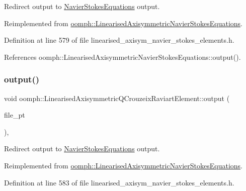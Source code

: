 Redirect output to \hyperlink{classoomph_1_1NavierStokesEquations}{Navier\+Stokes\+Equations} output. 



Reimplemented from \hyperlink{classoomph_1_1LinearisedAxisymmetricNavierStokesEquations_af91220377d90bc7506327e4f1de9e42a}{oomph\+::\+Linearised\+Axisymmetric\+Navier\+Stokes\+Equations}.



Definition at line 579 of file linearised\+\_\+axisym\+\_\+navier\+\_\+stokes\+\_\+elements.\+h.



References oomph\+::\+Linearised\+Axisymmetric\+Navier\+Stokes\+Equations\+::output().

\mbox{\label{classoomph_1_1LinearisedAxisymmetricQCrouzeixRaviartElement_a36138cdd6b03f179d648edeb0b0b31e1}} 
\subsubsection{\texorpdfstring{output()}{output()}\hspace{0.1cm}{\footnotesize\ttfamily [3/4]}}
{\footnotesize\ttfamily void oomph\+::\+Linearised\+Axisymmetric\+Q\+Crouzeix\+Raviart\+Element\+::output (\begin{DoxyParamCaption}\item[{F\+I\+LE $\ast$}]{file\+\_\+pt }\end{DoxyParamCaption})\hspace{0.3cm}{\ttfamily [inline]}, {\ttfamily [virtual]}}



Redirect output to \hyperlink{classoomph_1_1NavierStokesEquations}{Navier\+Stokes\+Equations} output. 



Reimplemented from \hyperlink{classoomph_1_1LinearisedAxisymmetricNavierStokesEquations_a11528829faa67968adcb46ad7cfa1fb2}{oomph\+::\+Linearised\+Axisymmetric\+Navier\+Stokes\+Equations}.



Definition at line 583 of file linearised\+\_\+axisym\+\_\+navier\+\_\+stokes\+\_\+elements.\+h.



